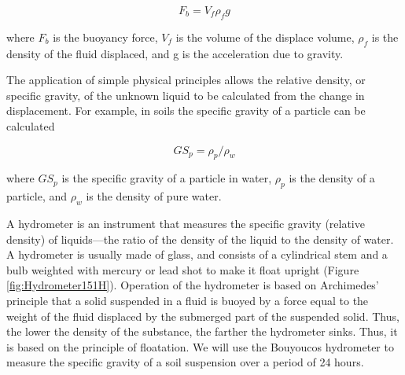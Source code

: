 \documentclass{tufte-handout}
\begin{document}
\begin{equation}
F_b = V_f \rho_f g
\end{equation}

\noindent where $F_b$ is the buoyancy force, $V_f$ is the volume of the displace volume, $\rho_f$ is the density of the fluid displaced, and g is the acceleration due to gravity.

The application of simple physical principles allows the relative density, or specific gravity, of the unknown liquid to be calculated from the change in displacement. For example, in soils the specific gravity of a particle can be calculated 

\begin{equation}
GS_p = \rho_p / \rho_w
\end{equation}

\noindent where $GS_p$ is the specific gravity of a particle in water, 
$\rho_p$ is the density of a particle, and
$\rho_w$ is the density of pure water.



A hydrometer is an instrument that measures the specific gravity (relative density) of liquids---the ratio of the density of the liquid to the density of water. A hydrometer is usually made of glass, and consists of a cylindrical stem and a bulb weighted with mercury or lead shot to make it float upright (Figure \ref{fig:Hydrometer151H}). Operation of the hydrometer is based on Archimedes' principle that a solid suspended in a fluid is buoyed by a force equal to the weight of the fluid displaced by the submerged part of the suspended solid. Thus, the lower the density of the substance, the farther the hydrometer sinks. Thus, it is based on the principle of floatation. We will use the Bouyoucos hydrometer to measure the specific gravity of a soil suspension over a period of 24 hours. 
\end{document}
